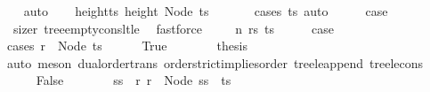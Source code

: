 \begin{isabellebody}
\ {}{\isacharparenleft}{\kern0pt}{}{\isacharparenright}{\kern0pt}\ \isamarkupfalse%
\ auto\isanewline
\ \ \isamarkupfalse%
\ height{\isacharunderscore}{\kern0pt}ts{\isacharcolon}{\kern0pt}\ {\isachardoublequoteopen}height\ {\isacharparenleft}{\kern0pt}Node\ ts{\isacharparenright}{\kern0pt}\ {\isasymge}\ {}{\isachardoublequoteclose}\ \isamarkupfalse%
\ {}{\isacharparenleft}{\kern0pt}{}{\isacharparenright}{\kern0pt}\ \isamarkupfalse%
\ {\isacharparenleft}{\kern0pt}cases\ ts{\isacharparenright}{\kern0pt}\ auto\isanewline
\ \ \isamarkupfalse%
\ \isamarkupfalse%
\ {\isacharquery}{\kern0pt}case\ \isamarkupfalse%
\ {}\ size{\isacharunderscore}{\kern0pt}r\ tree{\isacharunderscore}{\kern0pt}empty{\isacharunderscore}{\kern0pt}cons{\isacharunderscore}{\kern0pt}lt{\isacharunderscore}{\kern0pt}le\ \isamarkupfalse%
\ fastforce\isanewline
{}\isamarkupfalse%
\isanewline
\ \ \isamarkupfalse%
\ {\isacharparenleft}{\kern0pt}{}\ n\ rs\ ts{\isacharparenright}{\kern0pt}\isanewline
\ \ \isamarkupfalse%
\ \isamarkupfalse%
\ {\isacharquery}{\kern0pt}case\isanewline
\ \ \isamarkupfalse%
\ {\isacharparenleft}{\kern0pt}cases\ {\isachardoublequoteopen}r\ {\isacharless}{\kern0pt}\ Node\ ts{\isachardoublequoteclose}{\isacharparenright}{\kern0pt}\isanewline
\ \ \ \ \isamarkupfalse%
\ True\isanewline
\ \ \ \ \isamarkupfalse%
\ \isamarkupfalse%
\ {\isacharquery}{\kern0pt}thesis\ \isamarkupfalse%
\ {\isacharparenleft}{\kern0pt}auto{\isacharcomma}{\kern0pt}\ meson\ dual{\isacharunderscore}{\kern0pt}order{\isachardot}{\kern0pt}trans\ order{\isachardot}{\kern0pt}strict{\isacharunderscore}{\kern0pt}implies{\isacharunderscore}{\kern0pt}order\ tree{\isacharunderscore}{\kern0pt}le{\isacharunderscore}{\kern0pt}append\ tree{\isacharunderscore}{\kern0pt}le{\isacharunderscore}{\kern0pt}cons{\isacharparenright}{\kern0pt}\isanewline
\ \ \isamarkupfalse%
\isanewline
\ \ \ \ \isamarkupfalse%
\ False\isanewline
\ \ \ \ \isamarkupfalse%
\ \isamarkupfalse%
\ ss\ \ r{\isacharcolon}{\kern0pt}\ {\isachardoublequoteopen}r\ {\isacharequal}{\kern0pt}\ Node\ {\isacharparenleft}{\kern0pt}ss\ {\isacharat}{\kern0pt}\ ts{\isacharparenright}{\kern0pt}{\isachardoublequoteclose}\ \isamarkupfalse%

\end{isabellebody}
